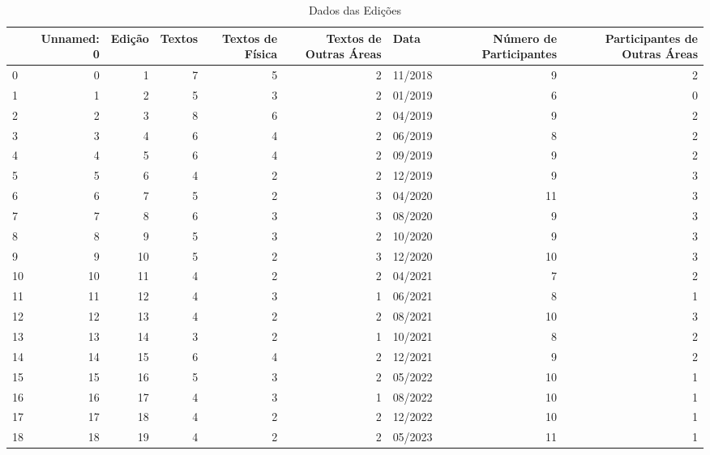 \begin{table}
\caption{Dados das Edições}
\label{tab:dados_edições}
\begin{tabular}{lrrrrrlrr}
\toprule
 & Unnamed: 0 & Edição & Textos & Textos de Física & Textos de Outras Áreas & Data & Número de Participantes & Participantes de Outras Áreas \\
\midrule
0 & 0 & 1 & 7 & 5 & 2 & 11/2018 & 9 & 2 \\
1 & 1 & 2 & 5 & 3 & 2 & 01/2019 & 6 & 0 \\
2 & 2 & 3 & 8 & 6 & 2 & 04/2019 & 9 & 2 \\
3 & 3 & 4 & 6 & 4 & 2 & 06/2019 & 8 & 2 \\
4 & 4 & 5 & 6 & 4 & 2 & 09/2019 & 9 & 2 \\
5 & 5 & 6 & 4 & 2 & 2 & 12/2019 & 9 & 3 \\
6 & 6 & 7 & 5 & 2 & 3 & 04/2020 & 11 & 3 \\
7 & 7 & 8 & 6 & 3 & 3 & 08/2020 & 9 & 3 \\
8 & 8 & 9 & 5 & 3 & 2 & 10/2020 & 9 & 3 \\
9 & 9 & 10 & 5 & 2 & 3 & 12/2020 & 10 & 3 \\
10 & 10 & 11 & 4 & 2 & 2 & 04/2021 & 7 & 2 \\
11 & 11 & 12 & 4 & 3 & 1 & 06/2021 & 8 & 1 \\
12 & 12 & 13 & 4 & 2 & 2 & 08/2021 & 10 & 3 \\
13 & 13 & 14 & 3 & 2 & 1 & 10/2021 & 8 & 2 \\
14 & 14 & 15 & 6 & 4 & 2 & 12/2021 & 9 & 2 \\
15 & 15 & 16 & 5 & 3 & 2 & 05/2022 & 10 & 1 \\
16 & 16 & 17 & 4 & 3 & 1 & 08/2022 & 10 & 1 \\
17 & 17 & 18 & 4 & 2 & 2 & 12/2022 & 10 & 1 \\
18 & 18 & 19 & 4 & 2 & 2 & 05/2023 & 11 & 1 \\
\bottomrule
\end{tabular}
\end{table}
